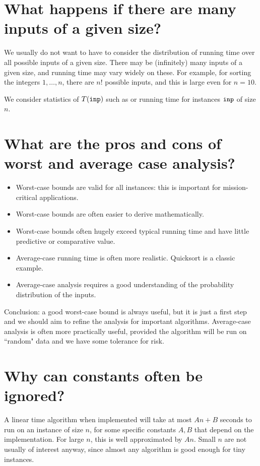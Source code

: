 \section{What happens if there are many inputs of a given size?}
We usually do not want to have to consider the distribution of
running time over all possible inputs of a given size. 
There may be (infinitely) many inputs of a given size, and running time may vary widely on these. 
For example, for sorting the integers $1, \dots, n$, there are $n!$ possible inputs, and this is large even for $n=10$.

We consider statistics of $T(\operatorname{\text{\texttt{inp}}})$ such as   or 
 running time for instances $\operatorname{\text{\texttt{inp}}}$ of size $n$.

\section{What are the pros and cons of worst and average case analysis?}
\begin{itemize}
\item Worst-case bounds are valid for all instances: 
this is important for mission-critical applications.
\item Worst-case bounds are often easier to derive mathematically.
\item Worst-case bounds often hugely exceed typical running time and 
have little predictive or comparative value. 
\item Average-case running time is often more realistic. Quicksort is a classic 
example.
\item Average-case analysis requires a good understanding of the probability 
distribution of the inputs.
\end{itemize}
Conclusion: a good worst-case bound is always useful, but it is
just a first step and we should aim to refine the analysis for important 
algorithms. Average-case analysis is often more practically useful, provided the
algorithm will be run on ``random" data and we have some tolerance for risk.

\section{Why can constants often be ignored?}
A linear time algorithm when implemented will take at most $An + B$ seconds to run on an instance of size $n$, 
for some specific constants $A, B$ that depend on the implementation. 
For large $n$, this is well approximated by $An$. 
Small $n$ are not usually of interest anyway, since almost any algorithm is good enough for tiny instances. 
 
